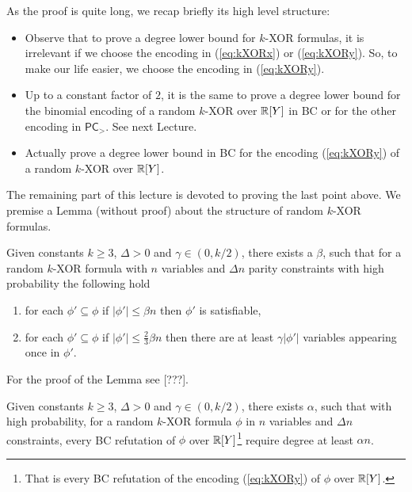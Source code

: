\documentclass[a4paper,twoside,justified]{tufte-handout}
\begin{document}
As the proof is quite long, we recap briefly its high level structure:
\begin{itemize}
\item Observe that to prove a degree lower bound for $k$-XOR formulas, it is irrelevant if we choose the encoding in (\ref{eq:kXORx}) or (\ref{eq:kXORy}). 
So, to make our life easier, we choose the encoding in (\ref{eq:kXORy}).
\item Up to a constant factor of $2$, it is the same to prove a degree lower bound for the binomial encoding of a random $k$-XOR over $\mathbb{R}[Y]$ in BC or for the other encoding in $\mathsf{PC}_>$. See next Lecture.
\item Actually prove a degree lower bound in BC for the encoding (\ref{eq:kXORy}) of a random $k$-XOR over $\mathbb{R}[Y]$.
\end{itemize}

The remaining part of this lecture is devoted to proving the last point above. We premise a Lemma (without proof) about the structure of random $k$-XOR formulas.

\begin{lemma}\label{lem:kXORsat}
Given constants $k\geq 3$, $\Delta>0$ and $\gamma\in (0,k/2)$, there exists a $\beta$, such that for a random $k$-XOR formula with $n$ variables and $\Delta n$ parity constraints with high probability the following hold
\begin{enumerate}
\item for each $\phi'\subseteq \phi$ if $|\phi'|\leq \beta n$ then $\phi'$ is satisfiable,
\item for each $\phi'\subseteq \phi$ if $|\phi'|\leq \frac{2}{3}\beta n$ then there are at least $\gamma |\phi'|$ variables appearing once in $\phi'$.
\end{enumerate}

\end{lemma}
For the proof of the Lemma see [???].

\begin{theorem}
Given constants $k\geq 3$, $\Delta>0$ and $\gamma \in (0,k/2)$, there exists $\alpha$, such that 
with high probability, for a random $k$-XOR formula $\phi$ in $n$ variables and $\Delta n$ constraints,
every BC refutation of $\phi$ over $\mathbb{R}[Y]$\footnote{
That is every BC refutation of the encoding (\ref{eq:kXORy}) of $\phi$ over $\mathbb{R}[Y]$.
} 
require degree at least $\alpha n$.
\end{theorem}
\end{document}
